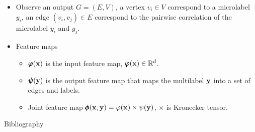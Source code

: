 \documentclass[first=dgreen,second=purple,logo=yellowexc]{aaltoslides}
\begin{document}
{\begin{frame}{}
	\begin{itemize}
		\item Observe an output $G=(E,V)$, a vertex $v_i\in V$ correspond to a microlabel $y_i$, an edge $(v_i,v_j)\in E$ correspond to the pairwise correlation of the microlabel $y_i$ and $y_j$.
		\item Feature maps
		\begin{itemize}
			\footnotesize
			\item $\pmb \varphi(\mathbf {x})$ is the  input feature map, $\pmb \varphi(\mathbf {x})\in\mathbb{R}^d$.
			\item $\pmb \psi(\mathbf {y})$ is the output feature map that maps the multilabel $\mathbf {y}$ into a set of edges and labels.
			\item Joint feature map $\pmb \phi(\mathbf {x},\mathbf {y}) = \varphi(\mathbf {x})\times\psi(\mathbf {y})$, $\times$ is Kronecker tensor.
		\end{itemize}
	\end{itemize}
\end{frame}

\begin{frame}[allowframebreaks]{Bibliography}
%

 
\end{frame}

}
\end{document}
